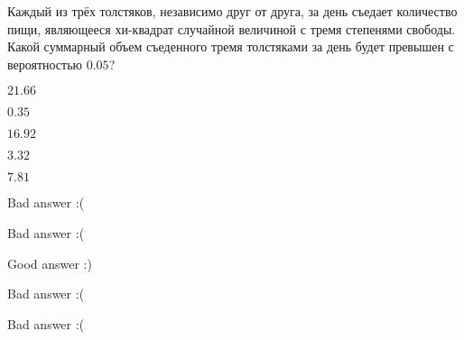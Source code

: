 
\begin{question}
Каждый из трёх толстяков, независимо друг от друга, за день съедает
количество пищи, являющееся хи-квадрат случайной величиной с тремя
степенями свободы. Какой суммарный объем съеденного тремя толстяками за
день будет превышен с вероятностью \(0.05\)?
\begin{answerlist}
  \item \(21.66\)
  \item \(0.35\)
  \item \(16.92\)
  \item \(3.32\)
  \item \(7.81\)
\end{answerlist}
\end{question}

\begin{solution}
\begin{answerlist}
  \item Bad answer :(
  \item Bad answer :(
  \item Good answer :)
  \item Bad answer :(
  \item Bad answer :(
\end{answerlist}
\end{solution}

